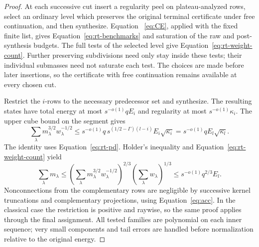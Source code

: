 \begin{proof}
At each successive cut insert a regularity peel on plateau-analyzed
rows, select an ordinary level which preserves the original terminal
certificate under free continuation, and then synthesize.  Equation~
\eqref{eq:CE}, applied with the fixed finite list, gives
Equation~\eqref{eq:rt-benchmarks} and saturation of the raw and
post-synthesis budgets.  The full tests of the selected level give
Equation~\eqref{eq:rt-weight-count}.  Further preserving
subdivisions need only stay inside these tests; their individual
submasses need not saturate each test.  The choices are made before
later insertions, so the certificate with free continuation remains
available at every chosen cut.

Restrict the $i$-rows to the necessary predecessor set and synthesize.
The resulting states have total energy at most $s^{-o(1)}qE_i$
and regularity at most $s^{-o(1)}\kappa_i$.  The upper cube bound
on the segment gives
\[
 \sum_\lambda m_\lambda^{3/2}w_\lambda^{-1/2}
 \le s^{-o(1)}q\,
       s^{(1/2-\Gamma)(l-i)}E_i\sqrt{\kappa_i}
 =s^{-o(1)}qE_l\sqrt{\kappa_l}.
\]
The identity uses Equation~\eqref{eq:rt-pd}.
Holder's inequality and Equation~\eqref{eq:rt-weight-count} yield
\[
 \sum_\lambda m_\lambda
 \le \left(\sum_\lambda m_\lambda^{3/2}w_\lambda^{-1/2}\right)^{2/3}
      \left(\sum_\lambda w_\lambda\right)^{1/3}
 \le s^{-o(1)}q^{2/3}E_l.
\]
Nonconnections from the complementary rows are negligible by
successive kernel truncations and complementary projections, using
Equation~\eqref{eq:acc}.  In the classical case the restriction is
positive and raywise, so the same proof applies through the final
assignment.  All tested families are polynomial on each inner
sequence; very small components and tail errors are handled before
normalization relative to the original energy.
\end{proof}


